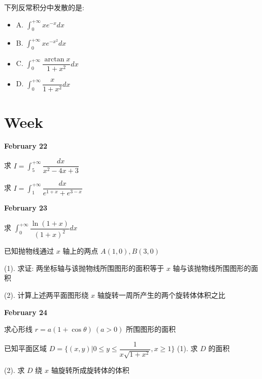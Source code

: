 \begin{example}[][Exam: 28.3.13]
	下列反常积分中发散的是:
\begin{itemize}
	\item A. $\int_{0}^{+\infty}xe^{-x}dx$
	\item B. $\int_{0}^{+\infty}xe^{-x^{2}}dx$
	\item C. $\int_{0}^{+\infty}\dfrac{\arctan x}{1+x^{2}}dx$
	\item D. $\int_{0}^{+\infty}\dfrac{x}{1+x^{2}}dx$
\end{itemize}
\end{example}

\section{Week }
\textcolor{purplea}{\textbf{February 22}}

\begin{example}[][Exam: 28.4.1]
求 $I=\int_{5}^{+\infty}\dfrac{dx}{x^{2}-4x+3}$
\end{example}

\begin{example}[][Exam: 28.4.2]
	求 $I=\int_{1}^{+\infty}\dfrac{dx}{e^{1+x}+e^{3-x}}$
\end{example}

\textcolor{purplea}{\textbf{February 23}}

\begin{example}[][Exam: 28.4.3]
	求 $\int_{0}^{+\infty}\dfrac{\ln(1+x)}{(1+x)^{2}}dx$
\end{example}

\begin{example}[][Exam: 28.4.4]
	已知抛物线通过 $x$ 轴上的两点 $A(1,0),B(3,0)$

(1). 求证: 两坐标轴与该抛物线所围图形的面积等于 $x$ 轴与该抛物线所围图形的面积

(2). 计算上述两平面图形绕 $x$ 轴旋转一周所产生的两个旋转体体积之比
\end{example}

\textcolor{purplea}{\textbf{February 24}}

\begin{example}[][Exam: 28.4.5]
	求心形线 $r=a(1+\cos\theta)\ (a>0)$ 所围图形的面积
\end{example}

\begin{example}[][Exam: 28.4.6]
	已知平面区域 $D=\{(x,y)|0\leq y\leq \dfrac{1}{x\sqrt{1+x^{2}}},x\geq 1\}$
(1). 求 $D$ 的面积

(2). 求 $D$ 绕 $x$ 轴旋转所成旋转体的体积
\end{example}

